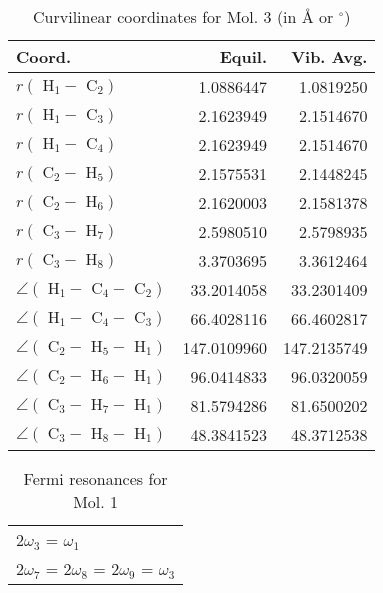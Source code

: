 \begin{table}
\centering
\caption{Curvilinear coordinates for Mol. 3 (in \AA{} or $^\circ$)}
\begin{tabular}{lrr}
       Coord.         &             Equil. &          Vib. Avg. \\
\hline
$r(\text{ H}_{1 } - \text{ C}_{2 })$ &          1.0886447 &          1.0819250 \\
$r(\text{ H}_{1 } - \text{ C}_{3 })$ &          2.1623949 &          2.1514670 \\
$r(\text{ H}_{1 } - \text{ C}_{4 })$ &          2.1623949 &          2.1514670 \\
$r(\text{ C}_{2 } - \text{ H}_{5 })$ &          2.1575531 &          2.1448245 \\
$r(\text{ C}_{2 } - \text{ H}_{6 })$ &          2.1620003 &          2.1581378 \\
$r(\text{ C}_{3 } - \text{ H}_{7 })$ &          2.5980510 &          2.5798935 \\
$r(\text{ C}_{3 } - \text{ H}_{8 })$ &          3.3703695 &          3.3612464 \\
$\angle(\text{ H}_{1 } - \text{ C}_{4 } - \text{ C}_{2 })$ &         33.2014058 &         33.2301409 \\
$\angle(\text{ H}_{1 } - \text{ C}_{4 } - \text{ C}_{3 })$ &         66.4028116 &         66.4602817 \\
$\angle(\text{ C}_{2 } - \text{ H}_{5 } - \text{ H}_{1 })$ &        147.0109960 &        147.2135749 \\
$\angle(\text{ C}_{2 } - \text{ H}_{6 } - \text{ H}_{1 })$ &         96.0414833 &         96.0320059 \\
$\angle(\text{ C}_{3 } - \text{ H}_{7 } - \text{ H}_{1 })$ &         81.5794286 &         81.6500202 \\
$\angle(\text{ C}_{3 } - \text{ H}_{8 } - \text{ H}_{1 })$ &         48.3841523 &         48.3712538 \\
\end{tabular}
\end{table}

\begin{table}
\centering
\caption{Fermi resonances for Mol. 1}
\begin{tabular}{l}
2$\omega_{3 }$ = $\omega_{1 }$ \\
2$\omega_{7 }$ = 2$\omega_{8 }$ = 2$\omega_{9 }$ = $\omega_{3 }$ \\
\end{tabular}
\end{table}

